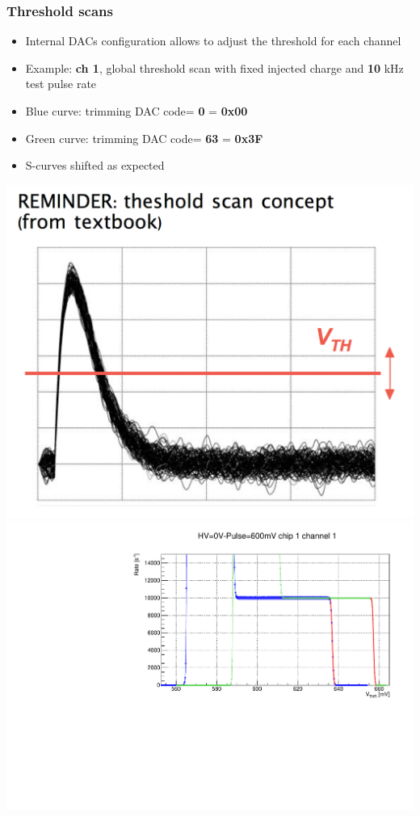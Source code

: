 \documentclass[aspectratio=169]{beamer}
\begin{document}
	\begin{frame}
	\frametitle{Threshold scans}
		\begin{itemize}
			\item Internal DACs configuration allows to adjust the threshold for each channel
			\item Example: \textbf{ch 1}, global threshold scan with fixed injected charge and \textbf{10} kHz test pulse rate
			\item {\color{blue}Blue} curve: trimming DAC code= \textbf{0} = \textbf{0x00}
			\item {\color{green}Green} curve: trimming DAC code= \textbf{63} = \textbf{0x3F}
			\item S-curves shifted as expected  
		\end{itemize}	
		\begin{center}
			\vspace*{-5mm} \includegraphics[width=0.35 \textwidth]{IMG/tscan_sketch.png}
			\includegraphics[width=0.55 \textwidth]{IMG/ThScan_ch0.pdf}
		\end{center}	
	\end{frame}

\end{document}
